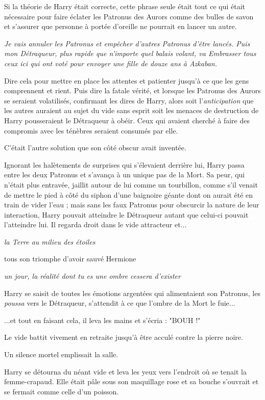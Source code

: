 Si la théorie de Harry était correcte, cette phrase seule était tout ce qui était nécessaire pour faire éclater les Patronus des Aurors comme des bulles de savon et s'assurer que personne à portée d'oreille ne pourrait en lancer un autre.

\emph{Je vais annuler les Patronus et empêcher d'autres Patronus d'être lancés. Puis mon Détraqueur, plus rapide que n'importe quel balais volant, va Embrasser tous ceux ici qui ont voté pour envoyer une fille de douze ans à Azkaban.} 

Dire cela pour mettre en place les attentes et patienter jusqu'à ce que les gens comprennent et rient. Puis dire la fatale vérité, et lorsque les Patronus des Aurors se seraient volatilisés, confirmant les dires de Harry, alors soit l'\emph{anticipation}  que les autres auraient au sujet du vide sans esprit soit les menaces de destruction de Harry pousseraient le Détraqueur à obéir. Ceux qui avaient cherché à faire des compromis avec les ténèbres seraient consumés par elle.

C'était l'autre solution que son côté obscur avait inventée.

Ignorant les halètements de surprises qui s'élevaient derrière lui, Harry passa entre les deux Patronus et s'avança à un unique pas de la Mort. Sa peur, qui n'était plus entravée, jaillit autour de lui comme un tourbillon, comme s'il venait de mettre le pied à côté du siphon d'une baignoire géante dont on aurait été en train de vider l'eau ; mais sans les faux Patronus pour obscurcir la nature de leur interaction, Harry pouvait atteindre le Détraqueur autant que celui-ci pouvait l'atteindre lui. Il regarda droit dans le vide attracteur et...

\emph{la Terre au milieu des étoiles} 

tous son triomphe d'avoir sauvé Hermione

\emph{un jour, la réalité dont tu es une ombre cessera d'exister} 

Harry se saisit de toutes les émotions argentées qui alimentaient son Patronus, les \emph{poussa}  vers le Détraqueur, s'attendit à ce que l'ombre de la Mort le fuie...

...et tout en faisant cela, il leva les mains et s'écria : "BOUH !"

Le vide battit vivement en retraite jusqu'à être acculé contre la pierre noire.

Un silence mortel emplissait la salle.

Harry se détourna du néant vide et leva les yeux vers l'endroit où se tenait la femme-crapaud. Elle était pâle sous son maquillage rose et sa bouche s'ouvrait et se fermait comme celle d'un poisson.

